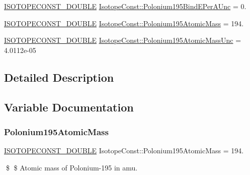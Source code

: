 \begin{DoxyCompactItemize}
\mbox{\hyperlink{group___isotope_const-_macros_ga8f45a7272ce02c0b4c65c44636ed719a}{I\+S\+O\+T\+O\+P\+E\+C\+O\+N\+S\+T\+\_\+\+D\+O\+U\+B\+LE}} \mbox{\hyperlink{group___isotope_const-_polonium-_po195_gabad8ca4e349bb415260ef96c7a3420f9}{Isotope\+Const\+::\+Polonium195\+Bind\+E\+Per\+A\+Unc}} = 0.
\item 
\mbox{\hyperlink{group___isotope_const-_macros_ga8f45a7272ce02c0b4c65c44636ed719a}{I\+S\+O\+T\+O\+P\+E\+C\+O\+N\+S\+T\+\_\+\+D\+O\+U\+B\+LE}} \mbox{\hyperlink{group___isotope_const-_polonium-_po195_gad038f68bb7b531493936b7c633841327}{Isotope\+Const\+::\+Polonium195\+Atomic\+Mass}} = 194.
\item 
\mbox{\hyperlink{group___isotope_const-_macros_ga8f45a7272ce02c0b4c65c44636ed719a}{I\+S\+O\+T\+O\+P\+E\+C\+O\+N\+S\+T\+\_\+\+D\+O\+U\+B\+LE}} \mbox{\hyperlink{group___isotope_const-_polonium-_po195_ga58da7c152ab1f6c6311a9262f64dc024}{Isotope\+Const\+::\+Polonium195\+Atomic\+Mass\+Unc}} = 4.\+0112e-\/05
\end{DoxyCompactItemize}


\subsection{Detailed Description}


\subsection{Variable Documentation}
\mbox{\label{group___isotope_const-_polonium-_po195_gad038f68bb7b531493936b7c633841327}} 
\subsubsection{\texorpdfstring{Polonium195\+Atomic\+Mass}{Polonium195AtomicMass}}
{\footnotesize\ttfamily \mbox{\hyperlink{group___isotope_const-_macros_ga8f45a7272ce02c0b4c65c44636ed719a}{I\+S\+O\+T\+O\+P\+E\+C\+O\+N\+S\+T\+\_\+\+D\+O\+U\+B\+LE}} Isotope\+Const\+::\+Polonium195\+Atomic\+Mass = 194.}

\$ \$ Atomic mass of Polonium-\/195 in amu. \mbox{\label{group___isotope_const-_polonium-_po195_ga58da7c152ab1f6c6311a9262f64dc024}} 
